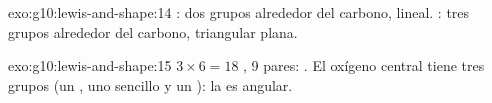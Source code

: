 \begin{solution}{exo:g10:lewis-and-shape:14}
: dos grupos alrededor del carbono, lineal.
: tres grupos alrededor del carbono,
triangular plana.
\end{solution}

\begin{solution}{exo:g10:lewis-and-shape:15}
$3 \times 6 = 18$ , 9 pares:
. El oxígeno central
tiene tres grupos (un , uno sencillo y un ): la  es angular.
\end{solution}

